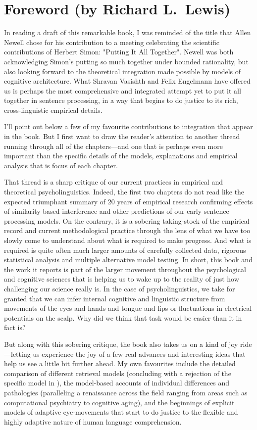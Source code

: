 \chapter*{Foreword (by Richard L.\ Lewis)}

In reading a draft of this remarkable book, I was reminded of the title
that Allen Newell chose for his contribution to a meeting celebrating
the scientific contributions of Herbert Simon: "Putting It All
Together".  Newell was both acknowledging Simon's putting so much
together under bounded rationality, but also looking forward to the
theoretical integration made possible by models of cognitive
architecture.  What Shravan Vasishth and Felix Engelmann have offered us
is perhaps the most comprehensive and integrated attempt yet to put it
all together in sentence processing, in a way that begins to do justice
to its rich, cross-linguistic empirical details.

I'll point out below a few of my favourite contributions to integration
that appear in the book.  But I first want to draw the reader's
attention to another thread running through all of the chapters---and
one that is perhaps even more important than the specific details of the
models, explanations and empirical analysis that is focus of each
chapter.

That thread is a sharp critique of our current practices in empirical
and theoretical psycholinguistics.  Indeed, the first two chapters do
not read like the expected triumphant summary of 20 years of empirical
research confirming effects of similarity based interference and other
predictions of our early sentence processing models. On the contrary, it
is a sobering taking-stock of the empirical record and current
methodological practice through the lens of what we have too slowly come
to understand about what is required to make progress.  And what is
required is quite often much larger amounts of carefully collected data,
rigorous statistical analysis and multiple alternative model testing. In
short, this book and the work it reports is part of the larger movement
throughout the psychological and cognitive sciences that is helping us
to wake up to the reality of just how challenging our science really is.
In the case of psycholinguistics, we take for granted that we can infer
internal cognitive and linguistic structure from movements of the eyes
and hands and tongue and lips or fluctuations in electrical potentials
on the scalp. Why did we think that task would be easier than it in fact
is?

But along with this sobering critique, the book also takes us on a kind
of joy ride---letting us experience the joy of a few real advances and
interesting ideas that help us see a little bit further ahead. My own
favourites include the detailed comparison of different retrieval models
(concluding with a rejection of the specific model in \citealp{LewisVasishth2005}), the model-based accounts of individual differences and
pathologies (paralleling a renaissance across the field  ranging from
areas such as computational psychiatry to cognitive aging), and the
beginnings of explicit models of adaptive eye-movements that start to do
justice to the flexible and highly adaptive nature of human language
comprehension.

